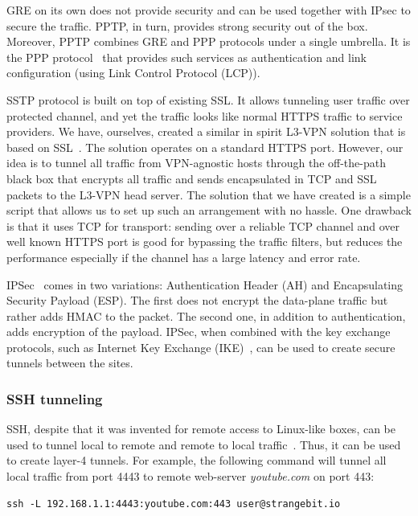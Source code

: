 GRE on its own does not provide security and can be used together with IPsec to secure 
the traffic. PPTP, in turn, provides strong security out of the box. Moreover, PPTP combines 
GRE and PPP protocols under a single umbrella. It is the PPP protocol~\cite{tcpip}
that provides such services as authentication and link configuration (\ie using Link Control Protocol (LCP)).

SSTP protocol is built on top of existing SSL. It allows tunneling user traffic over protected 
channel, and yet the traffic looks like normal HTTPS traffic to service providers.
We have, ourselves, created a similar in spirit L3-VPN solution that is based on SSL~\cite{ssl:vpn}.
The solution operates on a standard HTTPS port. However, our idea is to tunnel 
all traffic from VPN-agnostic hosts through the off-the-path black box that encrypts 
all traffic and sends encapsulated in TCP and SSL
packets to the L3-VPN head server. The solution that we have created is a simple script 
that allows us to set up such an arrangement with no hassle. One drawback is that it 
uses TCP for transport: sending over a reliable TCP channel and over well known HTTPS port
is good for bypassing the traffic filters, but reduces the performance especially if
the channel has a large latency and error rate. 

IPSec~\cite{tcpip} comes in two variations: Authentication Header (AH) and Encapsulating Security Payload (ESP).
The first does not encrypt the data-plane traffic but rather adds HMAC to the packet. The second one, in
addition to authentication, adds encryption of the payload. IPSec, when combined with the key exchange 
protocols, such as Internet Key Exchange (IKE)~\cite{rfc4306}, can be used to create secure tunnels between the sites.

\subsubsection{SSH tunneling}

SSH, despite that it was invented for remote access to Linux-like boxes, can be used 
to tunnel local to remote and remote to local traffic~\cite{ssh:tunneling}. Thus, it can be used to create
layer-4 tunnels. For example, the following command will tunnel all local traffic from
port 4443 to remote web-server {\it youtube.com} on port 443:

\begin{verbatim}
ssh -L 192.168.1.1:4443:youtube.com:443 user@strangebit.io
\end{verbatim}

